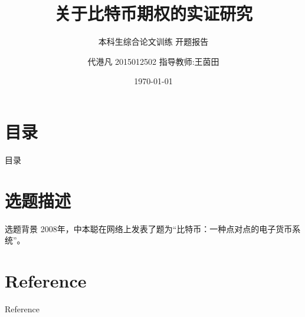 \documentclass[11pt,dark]{mathbeamer}
\title{关于比特币期权的实证研究 }
\subtitle{本科生综合论文训练 \newline 开题报告}
\author[代港凡 2015012502]{代港凡 2015012502 \newline 指导教师:王茵田}
\institute{清华大学经济管理学院}
\date{\today}
\begin{document}
\section*{目录}
\begin{frame}{目录}
    \tableofcontents
\end{frame}
\section{选题描述}
\frame{\tableofcontents[currentsection]}
\begin{frame}{选题背景}
    2008年，中本聪在网络上发表了题为“比特币：一种点对点的电子货币系统”\cite{Nakamoto_bitcoin:a}。
\end{frame}
\section{Reference}
	\begin{frame}[t, allowframebreaks]{Reference}
		
	\end{frame}
\end{document}
